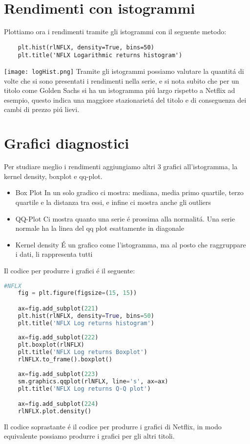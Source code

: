\documentclass{report}
\begin{document}
\section{Rendimenti con istogrammi}
Plottiamo ora i rendimenti tramite gli istogrammi con il seguente metodo:
\begin{lstlisting}
    plt.hist(rlNFLX, density=True, bins=50)
    plt.title('NFLX Logarithmic returns histogram')
\end{lstlisting}

\texttt{[image: logHist.png]}
Tramite gli istogrammi possiamo valutare la quantitá di volte che si sono presentati i rendimenti nella serie, e si nota subito che per un titolo come Golden Sachs si ha un istogramma piú largo rispetto a Netflix ad esempio, questo indica una maggiore stazionarietá del titolo e di conseguenza dei cambi di prezzo piú lievi.
\section{Grafici diagnostici}
Per studiare meglio i rendimenti aggiungiamo altri 3 grafici all'istogramma, la kernel density, boxplot e qq-plot.
\begin{itemize}[leftmargin=30pt, rightmargin=2cm]
\item Box Plot \textrightarrow{} In un solo gradico ci mostra: mediana, media primo quartile, terzo quartile e la distanza tra essi, e infine ci mostra anche gli outliers
\item QQ-Plot \textrightarrow{} Ci mostra quanto una serie é prossima alla normalitá. Una serie normale ha la linea del qq plot esattamente in diagonale
\item Kernel density \textrightarrow{} É un grafico come l'istogramma, ma al posto che raggruppare i dati, li rappresenta tutti
\end{itemize}
Il codice per produrre i grafici é il seguente:
\begin{lstlisting}[language=python]
    #NFLX
    fig = plt.figure(figsize=(15, 15))

    ax=fig.add_subplot(221)
    plt.hist(rlNFLX, density=True, bins=50)
    plt.title('NFLX Log returns histogram')
    
    ax=fig.add_subplot(222)
    plt.boxplot(rlNFLX)
    plt.title('NFLX Log returns Boxplot')
    rlNFLX.to_frame().boxplot()
    
    ax=fig.add_subplot(223)
    sm.graphics.qqplot(rlNFLX, line='s', ax=ax)
    plt.title('NFLX Log returns Q-Q plot')

    ax=fig.add_subplot(224)
    rlNFLX.plot.density()
\end{lstlisting}
Il codice soprastante é il codice per produrre i grafici di Netflix, in modo equivalente possiamo produrre i grafici per gli altri titoli.
\end{document}
